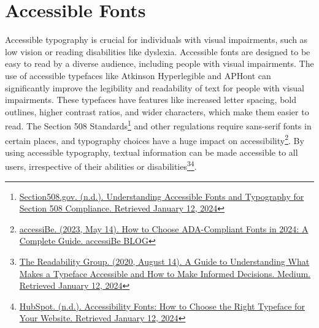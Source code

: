 \hypertarget{appx66}{}\chapter[\hfill\break\raggedright Accessible Fonts]{Accessible Fonts}\label{appx66}
\noindent\makebox[\linewidth]{\rule{\linewidth}{0.4pt}}
{\let\clearpage\relax\localtableofcontents}\newpage
Accessible typography is crucial for individuals with visual impairments, such as low vision or reading disabilities like dyslexia. Accessible fonts are designed to be easy to read by a diverse audience, including people with visual impairments. The use of accessible typefaces like Atkinson Hyperlegible and APHont can significantly improve the legibility and readability of text for people with visual impairments. These typefaces have features like increased letter spacing, bold outlines, higher contrast ratios, and wider characters, which make them easier to read. The Section 508 Standards\footnote{\raggedright \href{https://blog.hubspot.com/website/accessibility-fonts}{Section508.gov. (n.d.). Understanding Accessible Fonts and Typography for Section 508 Compliance. Retrieved January 12, 2024}} and other regulations require sans-serif fonts in certain places, and typography choices have a huge impact on accessibility\footnote{\raggedright \href{https://accessibe.com/blog/knowledgebase/ada-compliant-fonts}{accessiBe. (2023, May 14). How to Choose ADA-Compliant Fonts in 2024: A Complete Guide. accessiBe BLOG}}. By using accessible typography, textual information can be made accessible to all users, irrespective of their abilities or disabilities\footnote{\raggedright \href{https://medium.com/the-readability-group/a-guide-to-understanding-what-makes-a-typeface-accessible-and-how-to-make-informed-decisions-9e5c0b9040a0}{The Readability Group. (2020, August 14). A Guide to Understanding What Makes a Typeface Accessible and How to Make Informed Decisions. Medium. Retrieved January 12, 2024}}\fnsep\footnote{\raggedright \href{https://blog.hubspot.com/website/accessibility-fonts}{HubSpot. (n.d.). Accessibility Fonts: How to Choose the Right Typeface for Your Website. Retrieved January 12, 2024}}.

